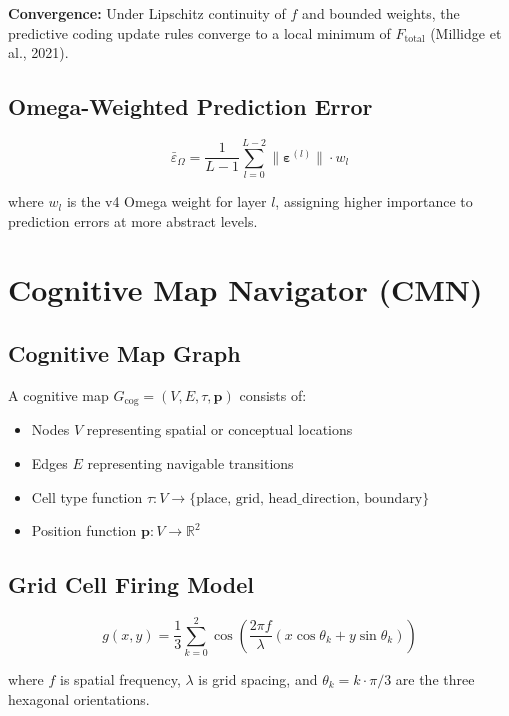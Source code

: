 \documentclass[11pt]{article}
\theoremstyle{plain}
\begin{document}
\textbf{Convergence:} Under Lipschitz continuity of \( f \) and bounded weights, the predictive coding update rules converge to a local minimum of \( F_{\text{total}} \) (Millidge et al., 2021).

\subsection{Omega-Weighted Prediction Error}

\begin{equation}
\bar{\varepsilon}_\Omega = \frac{1}{L-1} \sum_{l=0}^{L-2} \|\boldsymbol{\varepsilon}^{(l)}\| \cdot w_l
\end{equation}

where \( w_l \) is the v4 Omega weight for layer \( l \), assigning higher importance to prediction errors at more abstract levels.


\section{Cognitive Map Navigator (CMN)}

\subsection{Cognitive Map Graph}

A cognitive map \( G_{\text{cog}} = (V, E, \tau, \mathbf{p}) \) consists of:

\begin{itemize}
  \item Nodes \( V \) representing spatial or conceptual locations
  \item Edges \( E \) representing navigable transitions
  \item Cell type function \( \tau: V \to \{\text{place, grid, head\_direction, boundary}\} \)
  \item Position function \( \mathbf{p}: V \to \mathbb{R}^2 \)
\end{itemize}

\subsection{Grid Cell Firing Model}

\begin{equation}
g(x, y) = \frac{1}{3} \sum_{k=0}^{2} \cos\left(\frac{2\pi f}{\lambda} (x \cos\theta_k + y \sin\theta_k)\right)
\end{equation}

where \( f \) is spatial frequency, \( \lambda \) is grid spacing, and \( \theta_k = k \cdot \pi/3 \) are the three hexagonal orientations.
\end{document}
